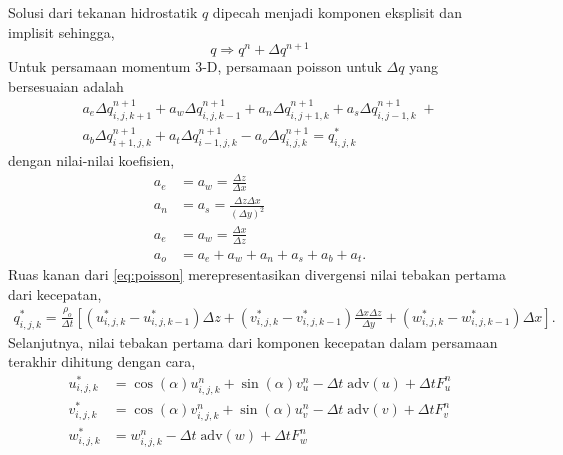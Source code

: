 \begin{spacing}{1.5}
	Solusi dari tekanan hidrostatik $q$ dipecah menjadi komponen eksplisit dan implisit sehingga,
	\begin{equation*}
		q \Rightarrow q^n + \Delta q^{n+1}
	\end{equation*}
	Untuk persamaan momentum 3-D, persamaan poisson untuk $\Delta q$ yang bersesuaian adalah
	\begin{equation}\label{eq:poisson}
		\begin{aligned}
			a_e \Delta q_{i,j,k+1}^{n+1} + a_w \Delta q_{i,j,k-1}^{n+1} + a_n \Delta q_{i,j+1,k}^{n+1} + a_s \Delta q_{i,j-1,k}^{n+1} \; + \\
			a_b \Delta q_{i+1,j,k}^{n+1} + 
			a_t \Delta q_{i-1,j,k}^{n+1} -
			a_o \Delta q_{i,j,k}^{n+1} = q_{i,j,k}^{*}
		\end{aligned}
	\end{equation}
	dengan nilai-nilai koefisien,
	\begin{equation}
		\begin{aligned}
			a_e &= a_w = \frac{\Delta z}{\Delta x} \\
			a_n &= a_s = \frac{\Delta z \Delta x}{(\Delta y)^2} \\
			a_e &= a_w = \frac{\Delta x}{\Delta z} \\
			a_o &= a_e + a_w + a_n + a_s + a_b + a_t.
		\end{aligned}
	\end{equation}
	Ruas kanan dari \ref{eq:poisson} merepresentasikan divergensi nilai tebakan pertama dari kecepatan, 
	\begin{equation*}
		\begin{aligned}
		q_{i,j,k}^{*} = \frac{\rho_o}{\Delta t}\left[(u_{i,j,k}^{*}-u_{i,j,k-1}^{*})\Delta z +  (v_{i,j,k}^{*}-v_{i,j,k-1}^{*})\frac{\Delta x \Delta z}{\Delta y}+(w_{i,j,k}^{*}-w_{i,j,k-1}^{*})\Delta x\right].
		\end{aligned}
	\end{equation*}
	Selanjutnya, nilai tebakan pertama dari komponen kecepatan dalam persamaan terakhir dihitung dengan cara,
	\begin{equation}
		\begin{aligned}
			u_{i,j,k}^{*} &= \cos(\alpha)u_{i,j,k}^{n}+\sin(\alpha)v_{u}^{n} - \Delta t \; \text{adv}(u) + \Delta t F_{u}^{n}\\
			v_{i,j,k}^{*} &= \cos(\alpha)v_{i,j,k}^{n}+\sin(\alpha)u_{v}^{n} - \Delta t \; \text{adv}(v) + \Delta t F_{v}^{n}\\
			w_{i,j,k}^{*} &= w_{i,j,k}^{n} - \Delta t \; \text{adv}(w) + \Delta t F_{w}^{n}

\end{aligned}
\end{equation}
\end{spacing}
